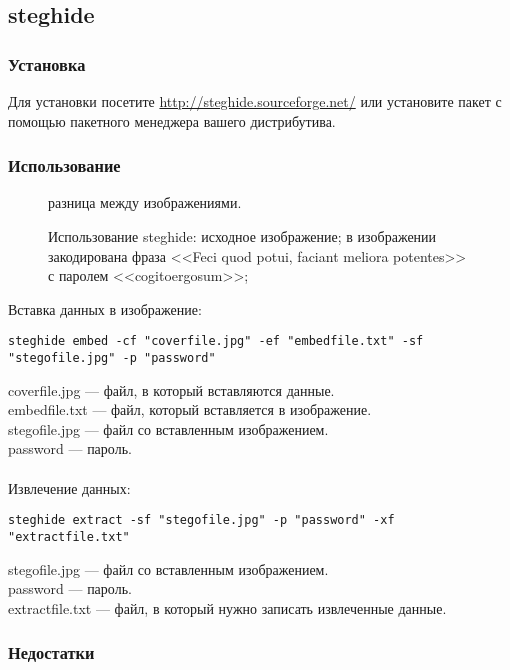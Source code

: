 \begin{enumerate}
\subsection{steghide}
\subsubsection{Установка}
Для установки посетите \url{http://steghide.sourceforge.net/} или установите пакет с помощью пакетного менеджера вашего дистрибутива.
\subsubsection{Использование}
\begin{figure}[ht!]
\vspace{-4ex}
\centering
{}
\hspace{4ex}
\hspace{4ex}
\caption{Использование steghide: 
 исходное изображение; 
 в изображении закодирована фраза <<Feci quod potui, faciant meliora potentes>> с паролем <<cogitoergosum>>; 
} разница между изображениями.
\end{figure}
Вставка данных в изображение:
\begin{lstlisting}
steghide embed -cf "coverfile.jpg" -ef "embedfile.txt" -sf "stegofile.jpg" -p "password"
\end{lstlisting}
coverfile.jpg --- файл, в который вставляются данные.\\
embedfile.txt --- файл, который вставляется в изображение.\\
stegofile.jpg --- файл со вставленным изображением.\\
password --- пароль.\\\\
Извлечение данных:
\begin{lstlisting}
steghide extract -sf "stegofile.jpg" -p "password" -xf "extractfile.txt"
\end{lstlisting}
stegofile.jpg --- файл со вставленным изображением.\\
password --- пароль.\\
extractfile.txt --- файл, в который нужно записать извлеченные данные.
\subsubsection{Недостатки}

\end{enumerate}
